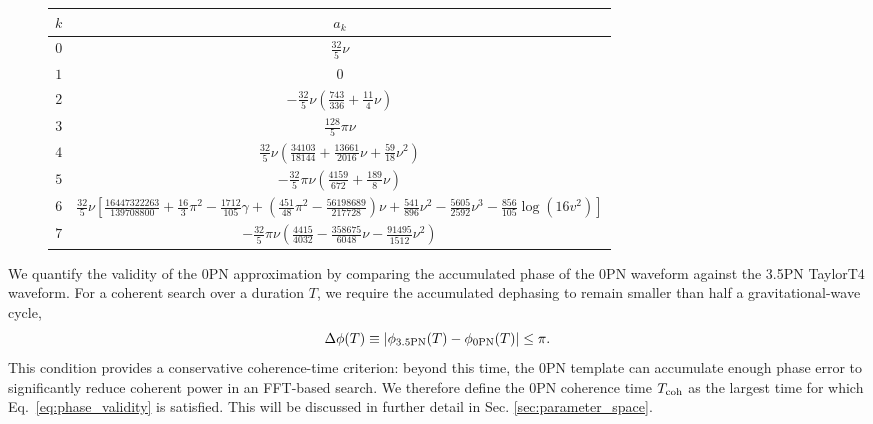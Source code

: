 \documentclass[aps,prd,amsmath,floats,floatfix, twocolumn,
superscriptaddress,nofootinbib,showpacs]{revtex4-2}
\begin{document}
\begin{figure}[t]
\begin{nolinenumbers}
\centering
\begin{minipage}{\textwidth}
\begin{tabular}{|c|c|}
\hline
$k$ & $a_k$ \\ 
\hline 
$0$ &
$\displaystyle \frac{32}{5}\nu$ \rule{0pt}{3.5ex}
\\[1.2ex]

$1$ &
$\displaystyle 0$
\\[1.2ex]

$2$ &
$\displaystyle
-\frac{32}{5}\nu
\left(
\frac{743}{336}
+
\frac{11}{4}\nu
\right)$
\\[2ex]

$3$ &
$\displaystyle
\frac{128}{5}\pi\nu$
\\[2ex]

$4$ &
$\displaystyle
\frac{32}{5}\nu
\left(
\frac{34103}{18144}
+
\frac{13661}{2016}\nu
+
\frac{59}{18}\nu^2
\right)$
\\[2ex]

$5$ &
$\displaystyle
-\frac{32}{5}\pi\nu
\left(
\frac{4159}{672}
+
\frac{189}{8}\nu
\right)$
\\[2ex]

$6$ &
$\displaystyle
\frac{32}{5}\nu
\left[
\frac{16447322263}{139708800}
+
\frac{16}{3}\pi^2
-
\frac{1712}{105}\gamma
+
\left(
\frac{451}{48}\pi^2
-
\frac{56198689}{217728}
\right)\nu
+
\frac{541}{896}\nu^2
-
\frac{5605}{2592}\nu^3
-
\frac{856}{105}\log(16v^2)
\right]$
\\[3ex]

$7$ &
$\displaystyle
-\frac{32}{5}\pi\nu
\left(
\frac{4415}{4032}
-
\frac{358675}{6048}\nu
-
\frac{91495}{1512}\nu^2
\right)$
\\[2ex]
\hline
\end{tabular}
\end{minipage}
\label{table:dvdt-coefficients}
\end{nolinenumbers}
\end{figure}

We quantify the validity of the 0PN approximation by comparing the accumulated phase of the 0PN waveform against the 3.5PN TaylorT4 waveform. For a coherent search over a duration $T$, we require the accumulated dephasing to remain smaller than half a gravitational-wave cycle,
\begin{equation}
    \Delta \phi(T)
    \equiv
    \left|
    \phi_{\rm 3.5PN}(T)-\phi_{\rm 0PN}(T)
    \right|
    \leq \pi .
    \label{eq:phase_validity}
\end{equation}
This condition provides a conservative coherence-time criterion: beyond this time, the 0PN template can accumulate enough phase error to significantly reduce coherent power in an FFT-based search. We therefore define the 0PN coherence time $T_{\rm coh}$ as the largest time for which Eq.~\eqref{eq:phase_validity} is satisfied. This will be discussed in further detail in Sec. \ref{sec:parameter_space}.
\end{document}
